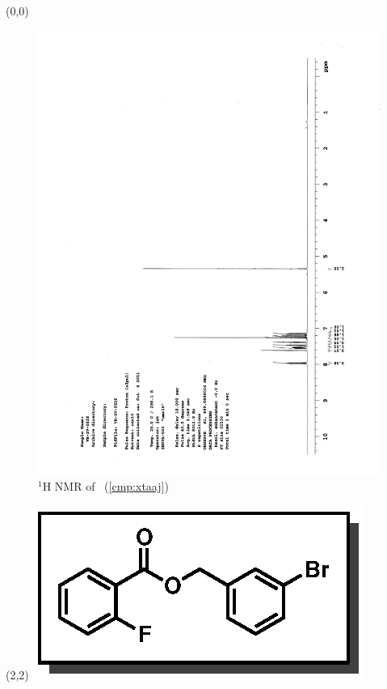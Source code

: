 \begin{textblock}{20}(0,0)
\begin{figure}[htb]
\caption{$^1$H NMR of \CMPxtaaj\ (\ref{cmp:xtaaj})}
\includegraphics[scale=0.75, trim = 0mm 0mm 0mm 5mm,
clip]{chp_asymmetric/images/nmr/xtaajH}
\vspace{-100pt}
\end{figure}
\end{textblock}
\begin{textblock}{1}(2,2)
\includegraphics[scale=0.8, angle=90]{chp_asymmetric/images/xtaaj}
\end{textblock}
